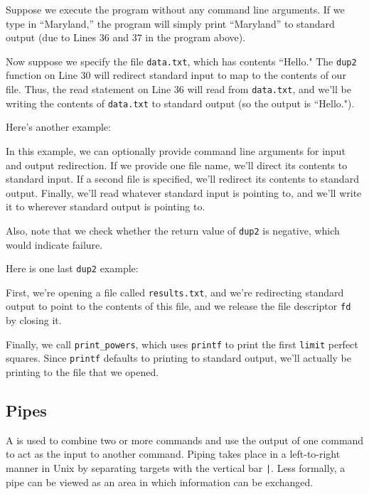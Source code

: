 Suppose we execute the program without any command line arguments. If we type in ``Maryland,'' the program will simply print ``Maryland'' to standard output (due to Lines $36$ and $37$ in the program above). 

Now suppose we specify the file \verb!data.txt!, which has contents ``Hello." The \verb!dup2! function on Line $30$ will redirect standard input to map to the contents of our file. Thus, the read statement on Line $36$ will read from \verb!data.txt!, and we'll be writing the contents of \verb!data.txt! to standard output (so the output is ``Hello."). 



Here's another example:

\lstset{caption=Dup2 Example 1}
\begin{center}

\end{center}

In this example, we can optionally provide command line arguments for input and output redirection. If we provide one file name, we'll direct its contents to standard input. If a second file is specified, we'll redirect its contents to standard output. Finally, we'll read whatever standard input is pointing to, and we'll write it to wherever standard output is pointing to.

Also, note that we check whether the return value of \verb!dup2! is negative, which would indicate failure. 


 Here is one last \verb!dup2! example:
 
 \lstset{caption=Dup2 Example 3}
\begin{center}

\end{center}

First, we're opening a file called \verb!results.txt!, and we're redirecting standard output to point to the contents of this file, and we release the file descriptor \verb!fd! by closing it. 

Finally, we call \verb!print_powers!, which uses \verb!printf! to print the first \verb!limit! perfect squares. Since \verb!printf! defaults to printing to standard output, we'll actually be printing to the file that we opened.


\subsection{Pipes}

A  is used to combine two or more commands and use the output of one command to act as the input to another command. Piping takes place in a left-to-right manner in Unix by separating targets with the vertical bar \verb!|!. Less formally, a pipe can be viewed as an area in which information can be exchanged.

